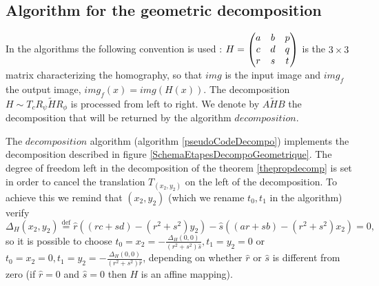 \subsection{Algorithm for the geometric decomposition}
 
 In the algorithms the following convention is used : $H = \begin{pmatrix} a&b&p\\c&d&q\\r&s&t \end{pmatrix}$ is the $3\times 3$ matrix characterizing the homography, so that $img$ is the input image and $img_f$ the output image, $img_f(x) = img(H(x))$. The decomposition $H \sim T_{c} R_{\psi}  \tilde H R_{\phi}$ is processed from left to right. We denote by $A \tilde H B$ the decomposition that will be returned by the algorithm $decomposition$. 
 
 
 The $decomposition$ algorithm (algorithm \ref{pseudoCodeDecompo}) implements the decomposition described in figure \ref{SchemaEtapesDecompoGeometrique}. The degree of freedom left in the decomposition of the theorem \ref{thepropdecomp} is set in order to cancel the translation $T_{(x_2,y_2)}$ on  the left of the decomposition. To achieve this we remind that $(x_2,y_2)$ (which we rename $t_0,t_1$ in the algorithm) verify
 \begin{equation}
 \Delta_H(x_2 , y_2 ) \stackrel{\text{def}}{=} \hat r ((rc+sd)-(r^2 + s^2)y_2) - \hat s ((ar+sb)-(r^2 + s^2 )x_2) = 0,
 \label{equationAlgo6}
 \end{equation}
 so it is possible to choose $t_0 = x_2 = -\frac{\Delta_H(0,0)}{(r^2+s^2)\hat s}, t_1 = y_2 = 0$ or $t_0 = x_2 = 0, t_1 = y_2 = -\frac{\Delta_H(0,0)}{(r^2+s^2)\hat r}$, depending on whether $\hat r$ or $\hat s$ is different from zero (if $\hat r=0$ and $\hat s=0$ then $H$ is an affine mapping). 
 
 
